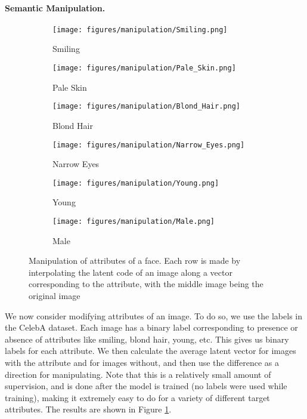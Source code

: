 \documentclass{article}
\begin{document}
\paragraph{Semantic Manipulation.}
\begin{figure}[t]
    \centering
    \begin{subfigure}{0.45\textwidth}
        \centering
        \texttt{[image: figures/manipulation/Smiling.png]}
        \caption{Smiling}
    \end{subfigure}
    \begin{subfigure}{0.45\textwidth}
        \centering
        \texttt{[image: figures/manipulation/Pale\_Skin.png]}
        \caption{Pale Skin}
    \end{subfigure}
    \begin{subfigure}{0.45\textwidth}
        \centering
        \texttt{[image: figures/manipulation/Blond\_Hair.png]}
        \caption{Blond Hair}
    \end{subfigure}
    \begin{subfigure}{0.45\textwidth}
        \centering
        \texttt{[image: figures/manipulation/Narrow\_Eyes.png]}
        \caption{Narrow Eyes}
    \end{subfigure}
    \begin{subfigure}{0.45\textwidth}
        \centering
        \texttt{[image: figures/manipulation/Young.png]}
        \caption{Young}
    \end{subfigure}
    \begin{subfigure}{0.45\textwidth}
        \centering
        \texttt{[image: figures/manipulation/Male.png]}
        \caption{Male}
    \end{subfigure}
    \caption{Manipulation of attributes of a face. Each row is made by interpolating the latent code of an image along a vector corresponding to the attribute, with the middle image being the original image}
    \label{fig:manipulation}
\end{figure}
We now consider modifying attributes of an image. To do so, we use the labels in the CelebA dataset. Each image has a binary label corresponding to presence or absence of attributes like smiling, blond hair, young, etc. This gives us  binary labels for each attribute. We then calculate the average latent vector  for images with the attribute and  for images without, and then use the difference  as a direction for manipulating. Note that this is a relatively small amount of supervision, and is done after the model is trained (no labels were used while training), making it extremely easy to do for a variety of different target attributes. The results are shown in Figure \ref{fig:manipulation}.
\end{document}

